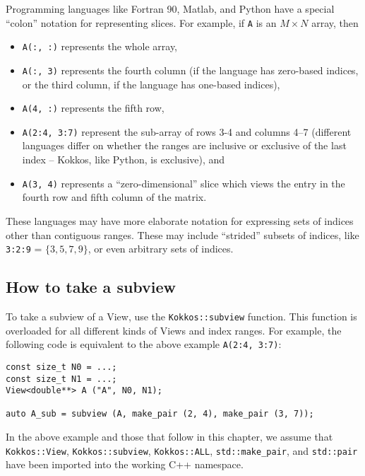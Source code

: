 Programming languages like Fortran 90, Matlab, and Python have a
special ``colon'' notation for representing slices.  For example, if
\texttt{A} is an $M \times N$ array, then
\begin{itemize}
\item \texttt{A(:, :)} represents the whole array,
\item \texttt{A(:, 3)} represents the fourth column (if the language
  has zero-based indices, or the third column, if the language has
  one-based indices),
\item \texttt{A(4, :)} represents the fifth row, 
\item \texttt{A(2:4, 3:7)} represent the sub-array of rows 3-4 and
  columns 4--7 (different languages differ on whether the ranges are
  inclusive or exclusive of the last index -- Kokkos, like Python, is
  exclusive), and
\item \texttt{A(3, 4)} represents a ``zero-dimensional'' slice which
  views the entry in the fourth row and fifth column of the matrix.
\end{itemize}
These languages may have more elaborate notation for expressing sets
of indices other than contiguous ranges.  These may include
``strided'' subsets of indices, like \texttt{3:2:9} = $\{ 3, 5, 7, 9
\}$, or even arbitrary sets of indices.

\subsection{How to take a subview}\label{S:Subviews:How}

To take a subview of a View, use the \texttt{Kokkos::subview}
function.  This function is overloaded for all different kinds of
Views and index ranges.  For example, the following code is equivalent
to the above example \texttt{A(2:4, 3:7)}:
\begin{lstlisting}
const size_t N0 = ...;
const size_t N1 = ...;
View<double**> A ("A", N0, N1);

auto A_sub = subview (A, make_pair (2, 4), make_pair (3, 7));
\end{lstlisting}
%
In the above example and those that follow in this chapter, 
we assume that \lstinline!Kokkos::View!, \lstinline!Kokkos::subview!,
\lstinline!Kokkos::ALL!, \lstinline!std::make_pair!, and \lstinline!std::pair!
have been imported into the working C++ namespace.


